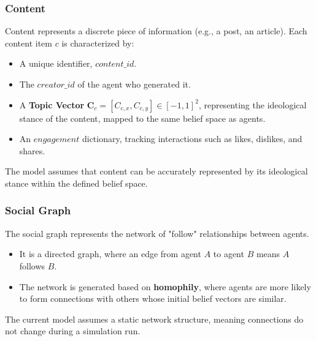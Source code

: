 \documentclass[10pt,a4paper]{article}
\newcommand{\contentvec}{\mathbf{C}}
\begin{document}
\subsubsection{Content}
Content represents a discrete piece of information (e.g., a post, an article). Each content item $c$ is characterized by:
\begin{itemize}
    \item A unique identifier, $content\_id$.
    \item The $creator\_id$ of the agent who generated it.
    \item A \textbf{Topic Vector} $\contentvec_c = [C_{c,x}, C_{c,y}] \in [-1, 1]^2$, representing the ideological stance of the content, mapped to the same belief space as agents.
    \item An $engagement$ dictionary, tracking interactions such as likes, dislikes, and shares.
\end{itemize}
The model assumes that content can be accurately represented by its ideological stance within the defined belief space.

\subsubsection{Social Graph}
The social graph represents the network of "follow" relationships between agents.
\begin{itemize}
    \item It is a directed graph, where an edge from agent $A$ to agent $B$ means $A$ follows $B$.
    \item The network is generated based on \textbf{homophily}, where agents are more likely to form connections with others whose initial belief vectors are similar.
\end{itemize}
The current model assumes a static network structure, meaning connections do not change during a simulation run.
\end{document}
